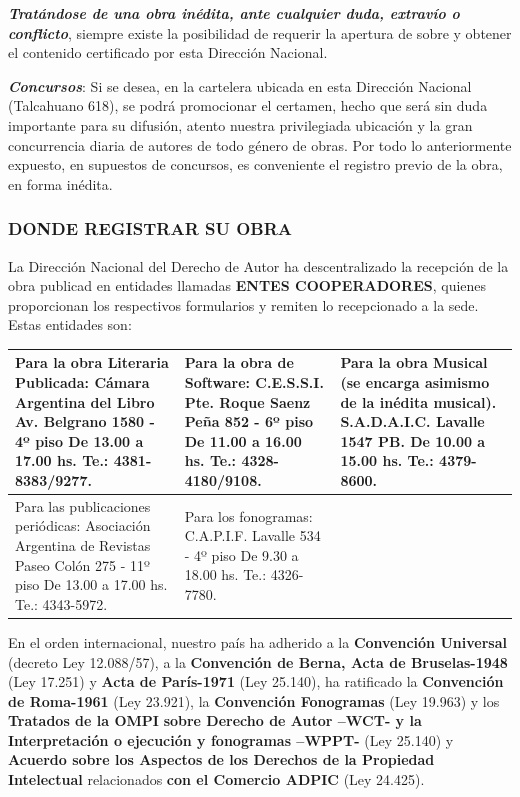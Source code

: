 \textbf{\textit{Tratándose de una obra inédita, ante cualquier duda, extravío o conflicto}}, siempre existe la posibilidad de requerir la apertura de sobre y obtener el contenido certificado por esta Dirección Nacional.



\textbf{\textit{Concursos}}: Si se desea, en la cartelera ubicada en esta Dirección Nacional (Talcahuano 618), se podrá promocionar el certamen, hecho que será sin duda importante para su difusión, atento nuestra privilegiada ubicación y la gran concurrencia diaria de autores de todo género de obras. Por todo lo anteriormente expuesto, en supuestos de concursos, es conveniente el registro previo de la obra, en forma inédita.

\subsubsection*{DONDE REGISTRAR SU OBRA}
La Dirección Nacional del Derecho de Autor ha descentralizado la recepción de la obra publicad en entidades llamadas \textbf{ENTES COOPERADORES}, quienes proporcionan los respectivos formularios y remiten lo recepcionado a la sede. Estas entidades son:


\begin{center}
\small
\begin{tabular}{|p{}|p{}|p{}|}
\hline
Para la obra Literaria Publicada: Cámara Argentina del Libro Av. Belgrano 1580 - 4º piso De 13.00 a 17.00 hs. Te.: 4381-8383/9277. & Para la obra de Software: C.E.S.S.I. Pte. Roque Saenz Peña 852 - 6º piso De 11.00 a 16.00 hs. Te.: 4328-4180/9108. & Para la obra Musical (se encarga asimismo de la inédita musical). S.A.D.A.I.C. Lavalle 1547 PB. De 10.00 a 15.00 hs. Te.: 4379-8600. \\ \hline
Para las publicaciones periódicas: Asociación Argentina de Revistas Paseo Colón 275 - 11º piso De 13.00 a 17.00 hs. Te.: 4343-5972. & Para los fonogramas: C.A.P.I.F. Lavalle 534 - 4º piso De 9.30 a 18.00 hs. Te.: 4326-7780. &  \\ \hline
\end{tabular}
\end{center}

En el orden internacional, nuestro país ha adherido a la \textbf{Convención Universal }(decreto Ley 12.088/57), a la \textbf{Convención de Berna, Acta de Bruselas-1948 }(Ley 17.251) y \textbf{Acta de París-1971 }(Ley 25.140), ha ratificado la \textbf{Convención de Roma-1961 }(Ley 23.921), la \textbf{Convención Fonogramas }(Ley 19.963) y los \textbf{Tratados de la OMPI} \textbf{sobre Derecho de Autor –WCT- y la Interpretación o ejecución y fonogramas –WPPT- }(Ley 25.140) y \textbf{Acuerdo sobre los Aspectos de los Derechos de la Propiedad Intelectual }relacionados \textbf{con el Comercio ADPIC} (Ley 24.425).

